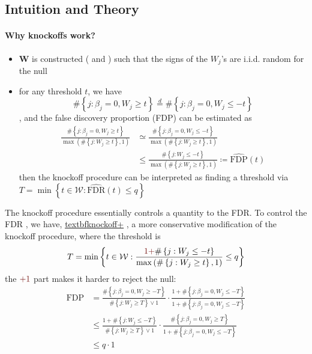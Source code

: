 \documentclass[twoside]{article}
\begin{document}
\subsection{Intuition and Theory}
\paragraph*{Why knockoffs work?}
\begin{itemize}
    \item $\mathbf{W}$ is constructed ( and ) such that the signs of the $W_j$'s are i.i.d. random for the null 
    \item for any threshold $t$, we have $$ \# \left\{ j:\beta_j=0,W_j\geq t \right\} \overset{d}{=} \# \left\{ j:\beta_j=0,W_j\leq -t \right\} $$, and the false discovery proportion (FDP) can be estimated as
    \begin{align*}
        \frac{\# \left\{ j:\beta_j=0,W_j\geq t \right\}}{\max\left( \# \left\{ j:W_j\geq t \right\},1 \right)} &\simeq \frac{\# \left\{ j:\beta_j=0,W_j\leq -t \right\}}{\max\left( \# \left\{ j:W_j\geq t \right\},1 \right)}\\
        &\leq  \frac{\# \left\{ j:W_j\leq -t \right\}}{\max\left( \# \left\{ j:W_j\geq t \right\},1 \right)} \coloneq \widehat{\mathrm{FDP}}(t)
    \end{align*}
    then the knockoff procedure can be interpreted as finding a threshold via $T=\min\left\{t\in \mathcal{W}:\widehat{\mathrm{FDR}}(t)\leq q \right\}$
\end{itemize}
The knockoff procedure essentially controls a quantity  to the FDR. To control the FDR , we have, \underline{textbf{knockoff+}} , a more conservative modification of the knockoff procedure, where the threshold is 
$$
T = \min\left\{ t\in\mathcal{W}: \frac{\textcolor{myred}{1+}\# \left\{ j:W_j\leq -t \right\}}{\max\left( \# \left\{ j:W_j\geq t \right\},1 \right)} \leq q \right\}
$$
the $\textcolor{myred}{+1}$ part makes it harder to reject the null:
\begin{align*}
    \mathrm{FDP} &= \frac{\# \left\{ j: \beta_j=0, W_j\geq -T \right\}}{\# \left\{ j: W_j\geq T \right\} \vee 1}\cdot \frac{1+ \# \left\{ j: \beta_j=0, W_j\leq -T \right\}}{1+\# \left\{ j: \beta_j=0, W_j\leq -T \right\}}\\
    & \leq \frac{1+ \# \left\{ j: W_j\leq -T \right\}}{\# \left\{ j: W_j\geq T \right\}\vee 1} \cdot \frac{\# \left\{ j: \beta_j=0, W_j\geq T \right\}}{1+\# \left\{ j: \beta_j=0, W_j\leq -T \right\}}\\
    & \leq  q \cdot 1
\end{align*}
\end{document}
